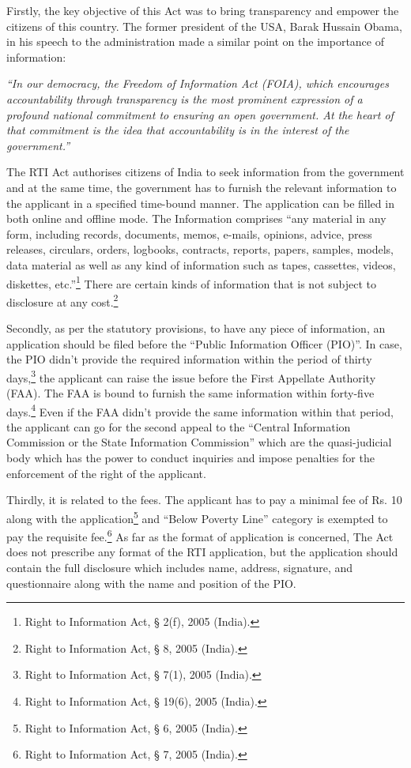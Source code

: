 \begin{multicols}{2}
\vspace{-.15cm}

\noi
Firstly, the key objective of this Act was to bring transparency and empower the citizens of
this country. The former president of the USA, Barak Hussain Obama, in his speech to the
administration made a similar point on the importance of information:

\noi
\begin{quoting}
\textit{“In our democracy, the Freedom of Information Act (FOIA), which encourages
accountability through transparency is the most prominent expression of a profound
national commitment to ensuring an open government. At the heart of that
commitment is the idea that accountability is in the interest of the government.”}
\end{quoting}

\noi
The RTI Act authorises citizens of India to seek information from the government and at the
same time, the government has to furnish the relevant information to the applicant in a
specified time-bound manner. The application can be filled in both online and offline mode.
The Information comprises “any material in any form, including records, documents, memos,
e-mails, opinions, advice, press releases, circulars, orders, logbooks, contracts, reports,
papers, samples, models, data material as well as any kind of information such as tapes,
cassettes, videos, diskettes, etc.”\footnote{Right to Information Act, § 2(f), 2005 (India).} 
 There are certain kinds of information that is not subject to
disclosure at any cost.\footnote{Right to Information Act, § 8, 2005 (India).}

\noi
Secondly, as per the statutory provisions, to have any piece of information, an application
should be filed before the “Public Information Officer (PIO)”. In case, the PIO didn’t provide
the required information within the period of thirty days,\footnote{Right to Information Act, § 7(1), 2005 (India).} 
 the applicant can raise the issue before the First Appellate Authority (FAA). The FAA is bound to furnish the same
information within forty-five days.\footnote{Right to Information Act, § 19(6), 2005 (India).} Even if the FAA didn’t provide the same information
within that period, the applicant can go for the second appeal to the “Central Information
Commission or the State Information Commission” which are the quasi-judicial body which
has the power to conduct inquiries and impose penalties for the enforcement of the right of
the applicant.

\noi
Thirdly, it is related to the fees. The applicant has to pay a minimal fee of Rs. 10 along with
the application\footnote{Right to Information Act, § 6, 2005 (India).} and “Below Poverty Line” category is exempted to pay the requisite fee.\footnote{Right to Information Act, § 7, 2005 (India).} As
far as the format of application is concerned, The Act does not prescribe any format of the
RTI application, but the application should contain the full disclosure which includes name,
address, signature, and questionnaire along with the name and position of the PIO.


\end{multicols}
